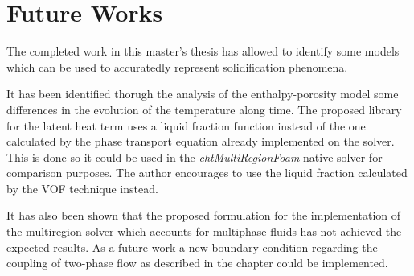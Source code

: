 \chapter{Future Works} %

\label{Chapter6}
\setlength{\parindent}{0.5cm} The completed work in this master's thesis has allowed to identify some models which can be used to accuratedly represent solidification phenomena. 

\noindent It has been identified thorugh the analysis of the enthalpy-porosity model some differences in the evolution of the temperature along time. The proposed library for the latent heat term uses a liquid fraction function instead of the one calculated by the phase transport equation already implemented on the solver. This is done so it could be used in the \textit{chtMultiRegionFoam} native solver for comparison purposes. The author encourages to use the liquid fraction calculated by the VOF technique instead.

\noindent It has also been shown that the proposed formulation for the implementation of the multiregion solver which accounts for multiphase fluids has not achieved the expected results. As a future work a new boundary condition regarding the coupling of two-phase flow as described in the chapter could be implemented.